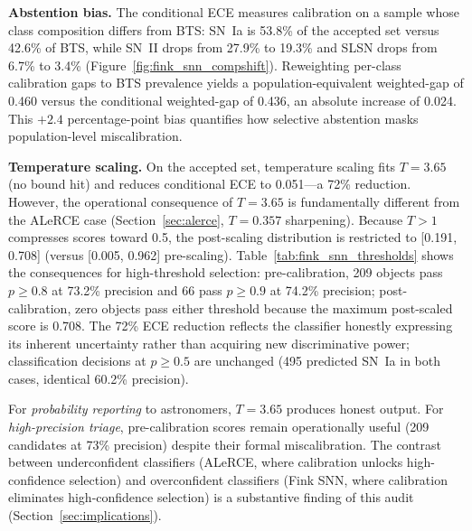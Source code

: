 \documentclass[twocolumn]{aastex631}
\begin{document}
\textbf{Abstention bias.} The conditional ECE measures calibration on a sample whose class composition differs from BTS: SN~Ia is 53.8\% of the accepted set versus 42.6\% of BTS, while SN~II drops from 27.9\% to 19.3\% and SLSN drops from 6.7\% to 3.4\% (Figure~\ref{fig:fink_snn_compshift}). Reweighting per-class calibration gaps to BTS prevalence yields a population-equivalent weighted-gap of 0.460 versus the conditional weighted-gap of 0.436, an absolute increase of 0.024. This $+2.4$ percentage-point bias quantifies how selective abstention masks population-level miscalibration.

\textbf{Temperature scaling.} On the accepted set, temperature scaling fits $T = 3.65$ (no bound hit) and reduces conditional ECE to 0.051---a 72\% reduction. However, the operational consequence of $T = 3.65$ is fundamentally different from the ALeRCE case (Section~\ref{sec:alerce}, $T = 0.357$ sharpening). Because $T > 1$ compresses scores toward 0.5, the post-scaling distribution is restricted to [0.191, 0.708] (versus [0.005, 0.962] pre-scaling). Table~\ref{tab:fink_snn_thresholds} shows the consequences for high-threshold selection: pre-calibration, 209 objects pass $p \ge 0.8$ at 73.2\% precision and 66 pass $p \ge 0.9$ at 74.2\% precision; post-calibration, zero objects pass either threshold because the maximum post-scaled score is 0.708. The 72\% ECE reduction reflects the classifier honestly expressing its inherent uncertainty rather than acquiring new discriminative power; classification decisions at $p \ge 0.5$ are unchanged (495 predicted SN~Ia in both cases, identical 60.2\% precision).

For \emph{probability reporting} to astronomers, $T = 3.65$ produces honest output. For \emph{high-precision triage}, pre-calibration scores remain operationally useful (209 candidates at 73\% precision) despite their formal miscalibration. The contrast between underconfident classifiers (ALeRCE, where calibration unlocks high-confidence selection) and overconfident classifiers (Fink SNN, where calibration eliminates high-confidence selection) is a substantive finding of this audit (Section~\ref{sec:implications}).
\end{document}

